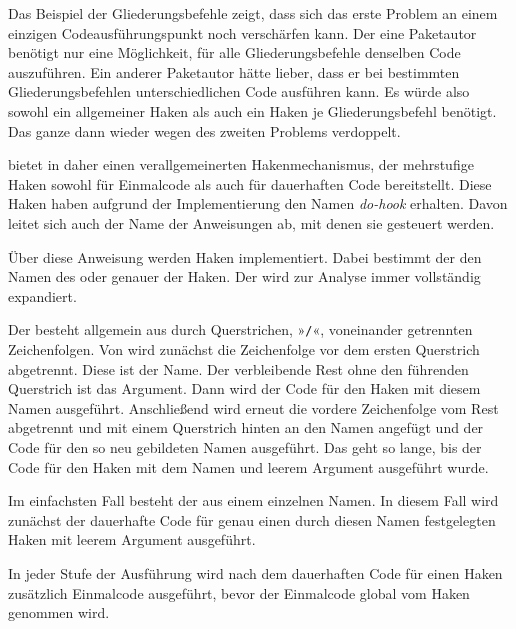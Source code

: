 Das Beispiel der Gliederungsbefehle zeigt, dass sich das erste Problem
an einem einzigen Codeausführungspunkt noch verschärfen kann. Der
eine Paketautor benötigt nur eine Möglichkeit, für alle
Gliederungsbefehle denselben Code auszuführen. Ein anderer Paketautor hätte
lieber, dass er bei bestimmten Gliederungsbefehlen unterschiedlichen Code
ausführen kann. Es würde also sowohl ein allgemeiner Haken als auch ein Haken
je Gliederungsbefehl benötigt. Das ganze dann wieder wegen des zweiten
Problems verdoppelt.

\KOMAScript{} bietet in  daher einen verallgemeinerten
Hakenmechanismus, der mehrstufige Haken sowohl für Einmalcode als auch für
dauerhaften Code bereitstellt. Diese Haken haben aufgrund der Implementierung
den Namen \emph{do-hook} erhalten. Davon leitet sich auch der Name der
Anweisungen ab, mit denen sie gesteuert werden.

\begin{Declaration}
\end{Declaration}
Über diese Anweisung werden Haken
implementiert. Dabei bestimmt der  den Namen des oder
genauer der Haken. Der  wird zur Analyse immer vollständig
expandiert.

Der  besteht allgemein aus durch Querstrichen,
»\texttt{/}«, voneinander getrennten Zeichenfolgen. Von 
wird zunächst die Zeichenfolge vor dem ersten Querstrich abgetrennt. Diese ist
der Name. Der verbleibende Rest ohne den führenden Querstrich ist das
Argument. Dann wird der Code für den Haken mit diesem Namen
ausgeführt. Anschließend wird erneut die vordere Zeichenfolge vom Rest
abgetrennt und mit einem Querstrich hinten an den Namen angefügt und der Code
für den so neu gebildeten Namen ausgeführt. Das geht so lange, bis der Code
für den Haken mit dem Namen  und leerem Argument
ausgeführt wurde.

Im einfachsten Fall besteht der  aus einem einzelnen
Namen. In diesem Fall wird zunächst der dauerhafte Code für genau einen durch
diesen Namen festgelegten Haken mit leerem Argument ausgeführt.

In jeder Stufe der Ausführung wird nach dem dauerhaften Code für einen Haken
zusätzlich Einmalcode ausgeführt, bevor der Einmalcode global vom Haken
genommen wird.

